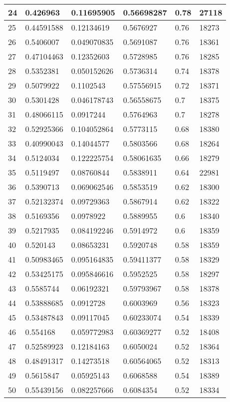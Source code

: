 \begin{longtable}{|l|l|l|l|l|l|}
24 & 0.426963 & 0.11695905 & 0.56698287 & 0.78 & 27118 \\ \hline 
25 & 0.44591588 & 0.12134619 & 0.5676927 & 0.76 & 18273 \\ \hline 
26 & 0.5406007 & 0.049070835 & 0.5691087 & 0.76 & 18361 \\ \hline 
27 & 0.47104463 & 0.12352603 & 0.5728985 & 0.76 & 18285 \\ \hline 
28 & 0.5352381 & 0.050152626 & 0.5736314 & 0.74 & 18378 \\ \hline 
29 & 0.5079922 & 0.1102543 & 0.57556915 & 0.72 & 18371 \\ \hline 
30 & 0.5301428 & 0.046178743 & 0.56558675 & 0.7 & 18375 \\ \hline 
31 & 0.48066115 & 0.0917244 & 0.5764963 & 0.7 & 18278 \\ \hline 
32 & 0.52925366 & 0.104052864 & 0.5773115 & 0.68 & 18380 \\ \hline 
33 & 0.40990043 & 0.14044577 & 0.5803566 & 0.68 & 18264 \\ \hline 
34 & 0.5124034 & 0.122225754 & 0.58061635 & 0.66 & 18279 \\ \hline 
35 & 0.5119497 & 0.08760844 & 0.5838911 & 0.64 & 22981 \\ \hline 
36 & 0.5390713 & 0.069062546 & 0.5853519 & 0.62 & 18300 \\ \hline 
37 & 0.52132374 & 0.09729363 & 0.5867914 & 0.62 & 18322 \\ \hline 
38 & 0.5169356 & 0.0978922 & 0.5889955 & 0.6 & 18340 \\ \hline 
39 & 0.5217935 & 0.084192246 & 0.5914972 & 0.6 & 18359 \\ \hline 
40 & 0.520143 & 0.08653231 & 0.5920748 & 0.58 & 18359 \\ \hline 
41 & 0.50983465 & 0.095164835 & 0.59411377 & 0.58 & 18329 \\ \hline 
42 & 0.53425175 & 0.095846616 & 0.5952525 & 0.58 & 18297 \\ \hline 
43 & 0.5585744 & 0.06192321 & 0.59793967 & 0.58 & 18378 \\ \hline 
44 & 0.53888685 & 0.0912728 & 0.6003969 & 0.56 & 18323 \\ \hline 
45 & 0.53487843 & 0.09117045 & 0.60233074 & 0.54 & 18339 \\ \hline 
46 & 0.554168 & 0.059772983 & 0.60369277 & 0.52 & 18408 \\ \hline 
47 & 0.52589923 & 0.12184163 & 0.6050024 & 0.52 & 18364 \\ \hline 
48 & 0.48491317 & 0.14273518 & 0.60564065 & 0.52 & 18313 \\ \hline 
49 & 0.5615847 & 0.05925143 & 0.6068588 & 0.54 & 18389 \\ \hline 
50 & 0.55439156 & 0.082257666 & 0.6084354 & 0.52 & 18334 \\ \hline 
\end{longtable}